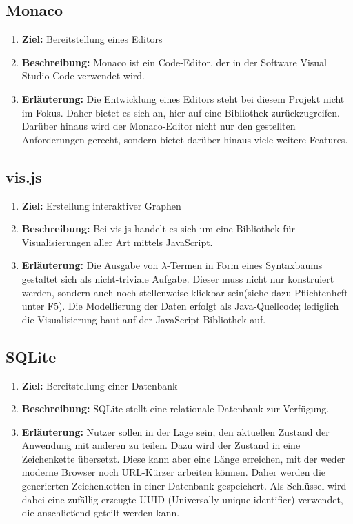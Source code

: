 \documentclass[parskip=full,11pt,twoside]{scrartcl}
\begin{document}
\subsection{Monaco}
\begin{enumerate}
\item[] \textbf{Ziel:} Bereitstellung eines Editors 
\item[] \textbf{Beschreibung:} Monaco ist ein Code-Editor, der in der Software Visual Studio Code verwendet wird.
\item[] \textbf{Erläuterung:} Die Entwicklung eines Editors steht bei diesem Projekt nicht im Fokus. 
Daher bietet es sich an, hier auf eine Bibliothek zurückzugreifen.
Darüber hinaus wird der Monaco-Editor nicht nur den gestellten Anforderungen gerecht, sondern bietet darüber hinaus viele weitere Features.
\end{enumerate}

\subsection{vis.js}
\begin{enumerate}
\item[] \textbf{Ziel:} Erstellung interaktiver Graphen 
\item[] \textbf{Beschreibung:} Bei vis.js handelt es sich um eine Bibliothek für Visualisierungen aller Art mittels JavaScript.
\item[] \textbf{Erläuterung:} Die Ausgabe von $\lambda$-Termen in Form eines Syntaxbaums gestaltet sich als nicht-triviale Aufgabe.
Dieser muss nicht nur konstruiert werden, sondern auch noch stellenweise klickbar sein(siehe dazu Pflichtenheft unter F5).
Die Modellierung der Daten erfolgt als Java-Quellcode; lediglich die Visualisierung baut auf der JavaScript-Bibliothek auf.
\end{enumerate}

\subsection{SQLite}
\begin{enumerate}
\item[] \textbf{Ziel:} Bereitstellung einer Datenbank 
\item[] \textbf{Beschreibung:} SQLite stellt eine relationale Datenbank zur Verfügung.
\item[] \textbf{Erläuterung:} Nutzer sollen in der Lage sein, den aktuellen Zustand der Anwendung mit anderen zu teilen.
Dazu wird der Zustand in eine Zeichenkette übersetzt.
Diese kann aber eine Länge erreichen, mit der weder moderne Browser noch URL-Kürzer arbeiten können.
Daher werden die generierten Zeichenketten in einer Datenbank gespeichert.
Als Schlüssel wird dabei eine zufällig erzeugte UUID (Universally unique identifier) verwendet, die anschließend geteilt werden kann.
\end{enumerate}
\end{document}
